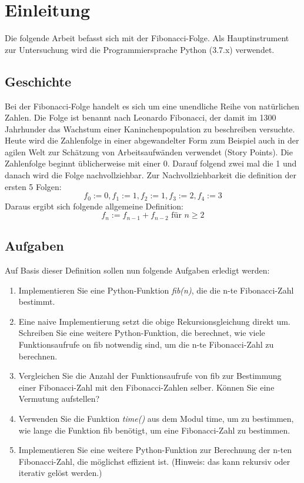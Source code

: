 \section{Einleitung}
Die folgende Arbeit befasst sich mit der Fibonacci-Folge.
Als Hauptinstrument zur Untersuchung wird die Programmiersprache
Python (3.7.x) verwendet.
\subsection{Geschichte}
Bei der Fibonacci-Folge handelt es sich um eine unendliche Reihe von natürlichen Zahlen.
Die Folge ist benannt nach Leonardo Fibonacci, 
der damit im 1300 Jahrhunder das Wachstum einer Kaninchenpopulation zu beschreiben versuchte.
Heute wird die Zahlenfolge in einer abgewandelter Form zum Beispiel auch
in der agilen Welt zur Schätzung von Arbeitsaufwänden verwendet (Story Points).
Die Zahlenfolge beginnt üblicherweise mit einer 0.
Darauf folgend zwei mal die 1 und danach wird die Folge nachvollziehbar.
Zur Nachvollziehbarkeit die definition der ersten 5 Folgen:
\begin{equation}
  f_0 := 0,
  f_1 := 1,
  f_2 := 1,
  f_3 := 2,
  f_4 := 3
\end{equation}
Daraus ergibt sich folgende allgemeine Definition:
\begin{equation}
  f_n := f_{n-1} + f_{n-2} \text{ für } n \ge 2
\end{equation}
\subsection{Aufgaben}
Auf Basis dieser Definition sollen nun folgende Aufgaben
erledigt werden:
\begin{enumerate}
  \item Implementieren Sie eine Python-Funktion \textit{fib(n)}, die die n-te Fibonacci-Zahl bestimmt.
  \item Eine naive Implementierung setzt die obige Rekursionsgleichung direkt um. Schreiben Sie eine weitere Python-Funktion, die berechnet, wie viele Funktionsaufrufe on fib notwendig sind, um die n-te Fibonacci-Zahl zu berechnen.
  \item Vergleichen Sie die Anzahl der Funktionsaufrufe von fib zur Bestimmung einer Fibonacci-Zahl mit den Fibonacci-Zahlen selber. Können Sie eine Vermutung aufstellen?
  \item Verwenden Sie die Funktion \textit{time()} aus dem Modul time, um zu bestimmen, wie lange die Funktion fib benötigt, um eine Fibonacci-Zahl zu bestimmen.
  \item Implementieren Sie eine weitere Python-Funktion zur Berechnung der n-ten Fibonacci-Zahl, die möglichst effizient ist. (Hinweis: das kann rekursiv oder iterativ gelöst werden.)
\end{enumerate}